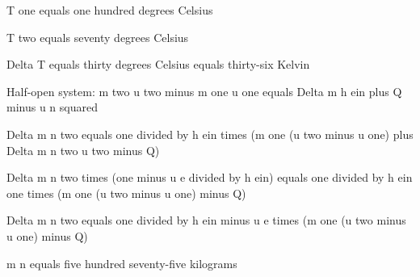 T one equals one hundred degrees Celsius

T two equals seventy degrees Celsius

Delta T equals thirty degrees Celsius equals thirty-six Kelvin

Half-open system: m two u two minus m one u one equals Delta m h ein plus Q minus u n squared

Delta m n two equals one divided by h ein times (m one (u two minus u one) plus Delta m n two u two minus Q)

Delta m n two times (one minus u e divided by h ein) equals one divided by h ein one times (m one (u two minus u one) minus Q)

Delta m n two equals one divided by h ein minus u e times (m one (u two minus u one) minus Q)

m n equals five hundred seventy-five kilograms